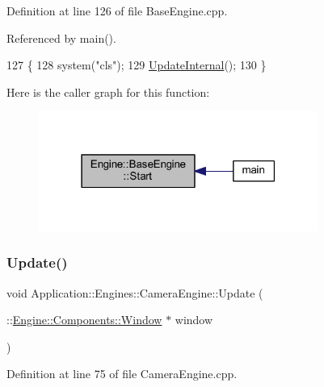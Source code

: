Definition at line 126 of file Base\+Engine.\+cpp.



Referenced by main().


\begin{DoxyCode}
127 \{
128     system(\textcolor{stringliteral}{"cls"});
129     \mbox{\hyperlink{classEngine_1_1BaseEngine_aad3c237ca657b9f22f76fccf7fc7561f}{UpdateInternal}}();
130 \}
\end{DoxyCode}
Here is the caller graph for this function\+:
\nopagebreak
\begin{figure}[H]
\begin{center}
\leavevmode
\includegraphics[width=259pt]{classEngine_1_1BaseEngine_a525fdc7a1da7eecb514ad5763f06be79_icgraph}
\end{center}
\end{figure}
\mbox{\label{classApplication_1_1Engines_1_1CameraEngine_a48f10aa5b7d87545f5c04d69c37df665}} 
\subsubsection{\texorpdfstring{Update()}{Update()}\hspace{0.1cm}{\footnotesize\ttfamily [1/2]}}
{\footnotesize\ttfamily void Application\+::\+Engines\+::\+Camera\+Engine\+::\+Update (\begin{DoxyParamCaption}\item[{\+::\mbox{\hyperlink{classEngine_1_1Components_1_1Window}{Engine\+::\+Components\+::\+Window}} $\ast$}]{window }\end{DoxyParamCaption})\hspace{0.3cm}{\ttfamily [override]}}



Definition at line 75 of file Camera\+Engine.\+cpp.



